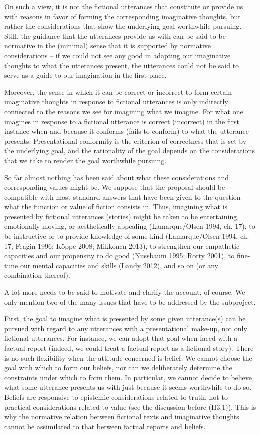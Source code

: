 \noindent On such a view, it is not the fictional utterances that constitute or provide us with reasons in favor of forming the corresponding imaginative thoughts, but rather the considerations that show the underlying goal worthwhile pursuing. Still, the guidance that the utterances provide us with can be said to be normative in the (minimal) sense that it is supported by normative considerations -- if we could not see any good in adapting our imaginative thoughts to what the utterances present, the utterances could not be said to serve as a guide to our imagination in the first place.

Moreover, the sense in which it can be correct or incorrect to form certain imaginative thoughts in response to fictional utterances is only indirectly connected to the reasons we see for imagining what we imagine. For what one imagines in response to a fictional utterance is correct (incorrect) in the first instance when and because it conforms (fails to conform) to what the utterance presents. Presentational conformity is the criterion of correctness that is set by the underlying goal, and the rationality of the goal depends on the considerations that we take to render the goal worthwhile pursuing.

So far almost nothing has been said about what these considerations and corresponding values might be. We suppose that the proposal should be compatible with most standard answers that have been given to the question what the function or value of fiction consists in. Thus, imagining what is presented by fictional utterances (stories) might be taken to be entertaining, emotionally moving, or aesthetically appealing (Lamarque/Olsen 1994, ch. 17), to be instructive or to provide knowledge of some kind (Lamarque/Olsen 1994, ch. 17; Feagin 1996; K\"oppe 2008; Mikkonen 2013), to strengthen our empathetic capacities and our propensity to do good (Nussbaum 1995; Rorty 2001), to fine-tune our mental capacities and skills (Landy 2012), and so on (or any combination thereof).

A lot more needs to be said to motivate and clarify the account, of course. We only mention two of the many issues that have to be addressed by the subproject.

First, the goal to imagine what is presented by some given utterance(s) can be pursued with regard to any utterances with a presentational make-up, not only fictional utterances. For instance, we can adopt that goal when faced with a factual report (indeed, we could treat a factual report as a fictional story). There is no such flexibility when the attitude concerned is belief. We cannot choose the goal with which to form our beliefs, nor can we deliberately determine the constraints under which to form them. In particular, we cannot decide to believe what some utterance presents us with just because it seems worthwhile to do so. Beliefs are responsive to epistemic considerations related to truth, not to practical considerations related to value (see the discussion before (H3.1)). This is why the normative relation between fictional texts and imaginative thoughts cannot be assimilated to that between factual reports and beliefs.

